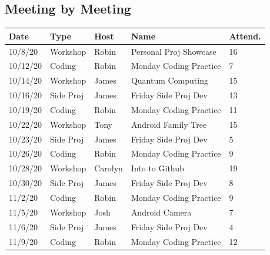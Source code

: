 \documentclass{article}
\begin{document}
\subsection{Meeting by Meeting}
\begin{table}[H]
\begin{tabular}{| m{1.6cm} | m{1.6cm} | m{1cm} | m{4.0cm} | m{1.2cm} |}
\hline
\textbf{Date} & \textbf{Type} & \textbf{Host} & \textbf{Name} & \textbf{Attend.} \\
\hline
10/8/20 & Workshop & Robin & Personal Proj Showcase & 16 \\
\hline
10/12/20 & Coding & Robin & Monday Coding Practice & 7 \\
\hline
10/14/20 & Workshop & James & Quantum Computing & 15 \\
\hline
10/16/20 & Side Proj & James & Friday Side Proj Dev & 13 \\
\hline
10/19/20 & Coding & Robin & Monday Coding Practice & 11 \\
\hline
10/22/20 & Workshop & Tony & Android Family Tree & 15 \\
\hline
10/23/20 & Side Proj & James & Friday Side Proj Dev & 5 \\
\hline
10/26/20 & Coding & Robin & Monday Coding Practice & 9 \\
\hline
10/28/20 & Workshop & Carolyn & Into to Github & 19 \\
\hline
10/30/20 & Side Proj & James & Friday Side Proj Dev & 8 \\
\hline
11/2/20 & Coding & Robin & Monday Coding Practice & 9 \\
\hline
11/5/20 & Workshop & Josh & Android Camera & 7 \\
\hline
11/6/20 & Side Proj & James & Friday Side Proj Dev & 4 \\
\hline
11/9/20 & Coding & Robin & Monday Coding Practice & 12 \\
\hline
\end{tabular}
\end{table}
\end{document}
